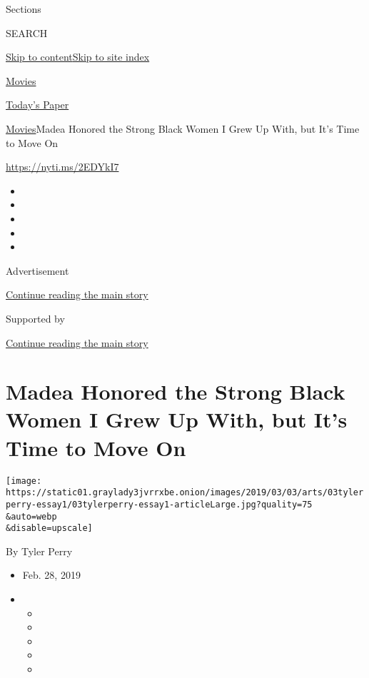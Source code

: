 Sections

SEARCH

\protect\hyperlink{site-content}{Skip to
content}\protect\hyperlink{site-index}{Skip to site index}

\href{https://www.nytimes3xbfgragh.onion/section/movies}{Movies}

\href{https://myaccount.nytimes3xbfgragh.onion/auth/login?response_type=cookie\&client_id=vi}{}

\href{https://www.nytimes3xbfgragh.onion/section/todayspaper}{Today's
Paper}

\href{/section/movies}{Movies}\textbar{}Madea Honored the Strong Black
Women I Grew Up With, but It's Time to Move On

\url{https://nyti.ms/2EDYkI7}

\begin{itemize}
\item
\item
\item
\item
\item
\end{itemize}

Advertisement

\protect\hyperlink{after-top}{Continue reading the main story}

Supported by

\protect\hyperlink{after-sponsor}{Continue reading the main story}

\hypertarget{madea-honored-the-strong-black-women-i-grew-up-with-but-its-time-to-move-on}{%
\section{Madea Honored the Strong Black Women I Grew Up With, but It's
Time to Move
On}\label{madea-honored-the-strong-black-women-i-grew-up-with-but-its-time-to-move-on}}

\texttt{[image: https://static01.graylady3jvrrxbe.onion/images/2019/03/03/arts/03tylerperry-essay1/03tylerperry-essay1-articleLarge.jpg?quality=75\\\&auto=webp\\\&disable=upscale]}

By Tyler Perry

\begin{itemize}
\item
  Feb. 28, 2019
\item
  \begin{itemize}
  \item
  \item
  \item
  \item
  \item
  \end{itemize}
\end{itemize}


